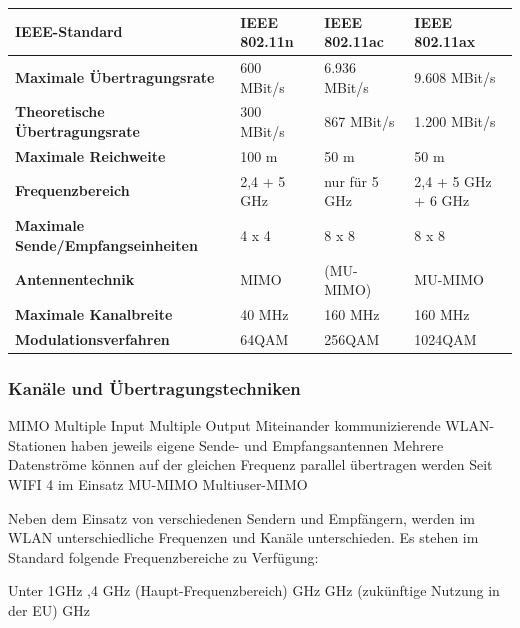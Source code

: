\documentclass[10pt]{article}
\begin{document}
\begin{flushleft}
\begin{table}[H]
\begin{tabular}{|p{}||p{}|p{}|p{}|}
        \textbf{IEEE-Standard}&\textbf{IEEE 802.11n}&\textbf{IEEE 802.11ac}&\textbf{IEEE 802.11ax}  \\\hline

        \hline

        \textbf{Maximale Übertragungsrate}&600 MBit/s&6.936 MBit/s&9.608 MBit/s \\\hline

        \textbf{Theoretische Übertragungsrate}&300 MBit/s&867 MBit/s&1.200 MBit/s \\\hline

        \textbf{Maximale Reichweite}&100 m&50 m&50 m \\\hline

        \textbf{Frequenzbereich}&2,4 + 5 GHz&nur für 5 GHz&2,4 + 5 GHz + 6 GHz \\\hline

        \textbf{Maximale Sende/Empfangseinheiten}&4 x 4&8 x 8&8 x 8 \\\hline

        \textbf{Antennentechnik}&MIMO&(MU-MIMO)&MU-MIMO \\\hline

        \textbf{Maximale Kanalbreite}&40 MHz&160 MHz&160 MHz \\\hline

        \textbf{Modulationsverfahren}&64QAM&256QAM&1024QAM
        
        \\\hline
    \end{tabular}
\end{table}

\subsubsection{Kanäle und Übertragungstechniken}

\begin{outline}
    \1 MIMO
        \2 Multiple Input Multiple Output
        \2 Miteinander kommunizierende WLAN-Stationen haben jeweils eigene Sende- und Empfangsantennen
        \2 \textrightarrow\space Mehrere Datenströme können auf der gleichen Frequenz parallel übertragen werden
        \2 Seit WIFI 4 im Einsatz
    \1 MU-MIMO
        \2 Multiuser-MIMO
\end{outline}

Neben dem Einsatz von verschiedenen Sendern und Empfängern, werden im WLAN unterschiedliche Frequenzen und Kanäle unterschieden.
Es stehen im Standard folgende Frequenzbereiche zu Verfügung:
\begin{outline}
    \1 Unter 1GHz
    ,4 GHz (Haupt-Frequenzbereich)
     GHz
     GHz (zukünftige Nutzung in der EU)
     GHz 
\end{outline}


\end{flushleft}
\end{document}
